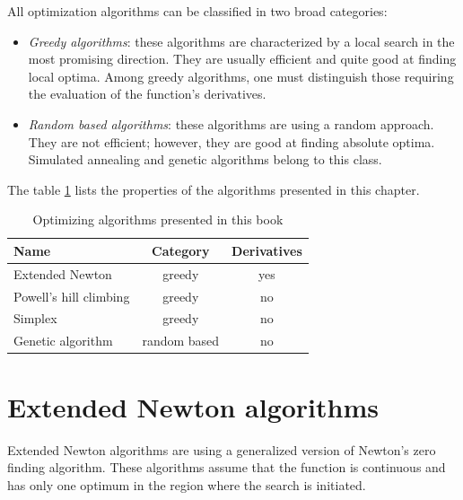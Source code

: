 \documentclass[twoside]{book}
\begin{document}
\noindent All optimization algorithms can be classified in two
broad categories:
\begin{itemize}
  \item {\sl Greedy algorithms}: these algorithms are characterized by a
  local search in the most promising direction. They are usually efficient
  and quite good at finding local optima. Among greedy algorithms,
  one must distinguish those requiring the evaluation of the
  function's derivatives.
  \item {\sl Random based algorithms}: these algorithms are using
  a random approach. They are not efficient; however, they are good at
  finding absolute optima. Simulated annealing \cite{Press} and
  genetic algorithms\cite{BerLin} belong to this class.
\end{itemize}
The table \ref{tb:optimizingalgorithms} lists the properties of
the algorithms presented in this chapter.
\begin{table}[h]
  \centering
  \caption{Optimizing algorithms presented in this book}\label{tb:optimizingalgorithms}
\vspace{1 ex}\begin{tabular}{| l | c | c |} \hline
  \hfil{\bf Name} & {\bf Category} & {\bf Derivatives} \\ \hline
  Extended Newton & greedy & yes \\
  Powell's hill climbing & greedy & no \\
  Simplex & greedy & no \\
  Genetic algorithm & random based & no \\ \hline
\end{tabular}
\end{table}


\section{Extended Newton algorithms}
Extended Newton algorithms are using a generalized version of
Newton's zero finding algorithm. These algorithms assume that the
function is continuous and has only one optimum in the region
where the search is initiated.
\end{document}
